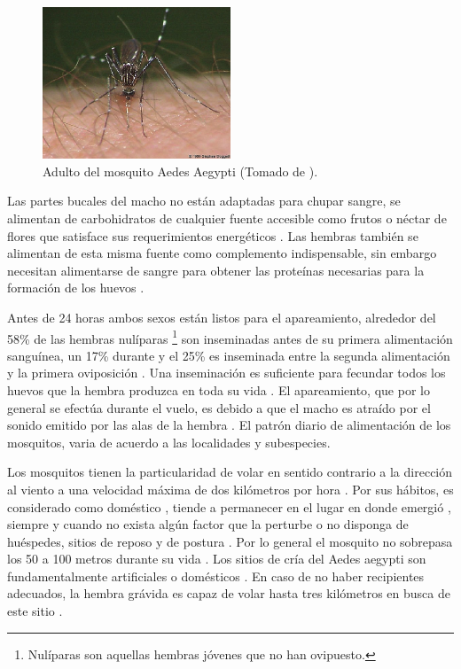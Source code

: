 \begin{figure}[!htbp]
\centering
\includegraphics[width=0.5\textwidth]{capitulo-3/graphics/adulto.png}
\caption{\label{fig:cap3-larvas} Adulto del mosquito Aedes Aegypti (Tomado de
\cite{directricesDetvArg}).}
\end{figure}

Las partes bucales del macho no están adaptadas para chupar sangre, se alimentan de carbohidratos
de cualquier fuente accesible como frutos o néctar de flores que satisface sus requerimientos
energéticos \cite{ThironIzcazaJ2003}. Las hembras también se alimentan de esta misma fuente como
complemento indispensable, sin embargo necesitan alimentarse de sangre para obtener las proteínas
necesarias para la formación de los huevos \cite{ThironIzcazaJ2003}.

Antes de 24 horas ambos sexos están listos para el apareamiento, alrededor del 58\% de las hembras
nulíparas \footnote{Nulíparas son aquellas hembras jóvenes que no han ovipuesto.} son inseminadas
antes de su primera alimentación sanguínea, un 17\% durante y el 25\% es inseminada entre la
segunda alimentación y la primera oviposición \cite{ThironIzcazaJ2003}. Una inseminación es
suficiente para fecundar todos los huevos que la hembra produzca en toda su vida
\cite{ThironIzcazaJ2003}. El apareamiento, que por lo general se efectúa durante el vuelo, es
debido a que el macho es atraído por el sonido emitido por las alas de la hembra
\cite{ThironIzcazaJ2003}. El patrón diario de alimentación de los mosquitos, varia de acuerdo a
las localidades y subespecies\cite{luevano1993ciclo}.

Los mosquitos tienen la particularidad de volar en sentido contrario a la dirección al viento
\cite{ThironIzcazaJ2003, web-site:speedAnimals} a una velocidad máxima de dos kilómetros por hora
\cite{web-site:speedAnimals,kaufmann2004flight}. Por sus hábitos, es considerado como doméstico
\cite{luevano1993ciclo}, tiende a permanecer en el lugar en donde emergió
\cite{cabezas2005dengue,ThironIzcazaJ2003}, siempre y cuando no exista algún factor que la
perturbe o no disponga de huéspedes, sitios de reposo y de postura  \cite{ThironIzcazaJ2003}. Por
lo general el mosquito no sobrepasa los 50 a 100 metros durante su vida \cite{cabezas2005dengue}.
Los sitios de cría del Aedes aegypti son fundamentalmente artificiales o domésticos
\cite{directricesDetvArg}. En caso de no haber recipientes adecuados, la hembra grávida es capaz
de volar hasta tres kilómetros en busca de este sitio \cite{ThironIzcazaJ2003}.

